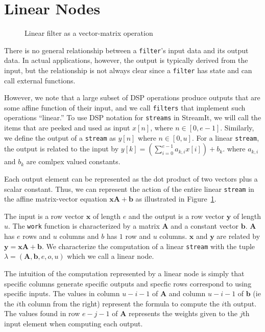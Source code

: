 \section{Linear Nodes}
\label{sec:linearrep}

\begin{figure}
\center
\epsfxsize=3.0in
\caption{Linear filter as a vector-matrix operation}
\label{fig:overview-matrix}
\vspace{-12pt}
\end{figure}

There is no general relationship between a {\tt filter}'s input data and
its output data. In actual applications, however, the output is typically 
derived from the input, but the relationship is not always clear 
since a {\tt filter} has state and can call external functions.

However, we note that a large subset of DSP operations produce outputs
that are some affine function of their input, and we call {\tt filters} that 
implement such operations ``linear.'' To use DSP notation for {\tt streams} in
StreamIt, we will call the items that are peeked and used as input
$x[n]$, where  $n\in[0,e-1]$. Similarly, we define the output of 
a {\tt stream} as $y[n]$ where  $n\in[0,u]$. For a linear {\tt stream}, 
the output is related to the input by $y[k] = (\sum_{i=0}^{e-1} a_{k,i}x[i])+b_k$.
where $a_{k,i}$ and $b_{k}$ are comlpex valued constants. 

Each output element can be represented as the dot product of two vectors 
plus a scalar constant.  Thus, we can represent the action of the 
entire linear {\tt stream} in the affine matrix-vector equation ${\mathbf x} {\mathbf A} + {\mathbf b}$ 
as illustrated in Figure~\ref{fig:overview-matrix}.

The input is a row vector ${\mathbf x}$ of length $e$
and the output is a row vector ${\mathbf y}$ of length $u$. The {\tt work} function
is characterized by a matrix ${\mathbf A}$ and a constant vector ${\mathbf b}$. 
${\mathbf A}$ has $e$ rows and $u$ columns and $b$ has $1$ row and $u$ columns. 
${\mathbf x}$ and ${\mathbf y}$ are related by ${\mathbf y} = {\mathbf x}{\mathbf A} + {\mathbf b}$. 
We characterize the computation of a linear {\tt stream} with the tuple 
$\lambda = ({\mathbf A},{\mathbf b},e,o,u)$ which we call a linear node.

The intuition of the computation represented by a linear node is simply
that specific columns generate specific outputs and specfic rows 
correspond to using specific inputs.
The values in column $u-i-1$ of ${\mathbf A}$ and column $u-i-1$ of ${\mathbf b}$ 
(ie the $i$th column from the right) represent the formula to compute the $i$th output.
The values found in row $e-j-1$ of ${\mathbf A}$ represents the weights given to the $j$th 
input element when computing each output.




